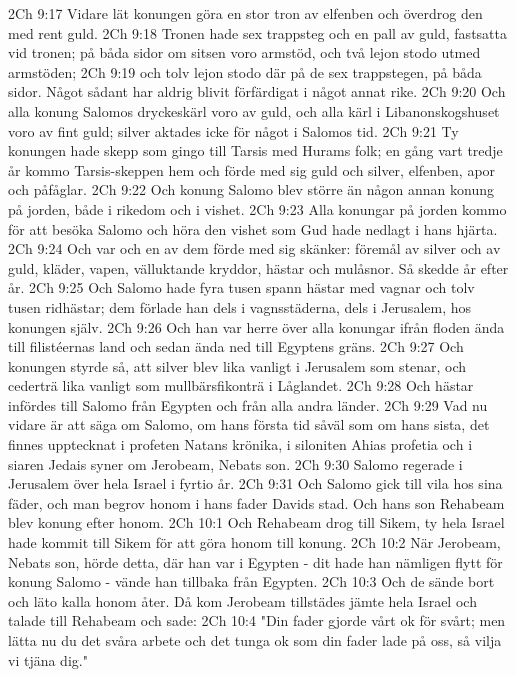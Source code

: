 2Ch 9:17  Vidare lät konungen göra en stor tron av elfenben och överdrog den med rent guld.
2Ch 9:18  Tronen hade sex trappsteg och en pall av guld, fastsatta vid tronen; på båda sidor om sitsen voro armstöd, och två lejon stodo utmed armstöden;
2Ch 9:19  och tolv lejon stodo där på de sex trappstegen, på båda sidor. Något sådant har aldrig blivit förfärdigat i något annat rike.
2Ch 9:20  Och alla konung Salomos dryckeskärl voro av guld, och alla kärl i Libanonskogshuset voro av fint guld; silver aktades icke för något i Salomos tid.
2Ch 9:21  Ty konungen hade skepp som gingo till Tarsis med Hurams folk; en gång vart tredje år kommo Tarsis-skeppen hem och förde med sig guld och silver, elfenben, apor och påfåglar.
2Ch 9:22  Och konung Salomo blev större än någon annan konung på jorden, både i rikedom och i vishet.
2Ch 9:23  Alla konungar på jorden kommo för att besöka Salomo och höra den vishet som Gud hade nedlagt i hans hjärta.
2Ch 9:24  Och var och en av dem förde med sig skänker: föremål av silver och av guld, kläder, vapen, välluktande kryddor, hästar och mulåsnor. Så skedde år efter år.
2Ch 9:25  Och Salomo hade fyra tusen spann hästar med vagnar och tolv tusen ridhästar; dem förlade han dels i vagnsstäderna, dels i Jerusalem, hos konungen själv.
2Ch 9:26  Och han var herre över alla konungar ifrån floden ända till filistéernas land och sedan ända ned till Egyptens gräns.
2Ch 9:27  Och konungen styrde så, att silver blev lika vanligt i Jerusalem som stenar, och cederträ lika vanligt som mullbärsfikonträ i Låglandet.
2Ch 9:28  Och hästar infördes till Salomo från Egypten och från alla andra länder.
2Ch 9:29  Vad nu vidare är att säga om Salomo, om hans första tid såväl som om hans sista, det finnes upptecknat i profeten Natans krönika, i siloniten Ahias profetia och i siaren Jedais syner om Jerobeam, Nebats son.
2Ch 9:30  Salomo regerade i Jerusalem över hela Israel i fyrtio år.
2Ch 9:31  Och Salomo gick till vila hos sina fäder, och man begrov honom i hans fader Davids stad. Och hans son Rehabeam blev konung efter honom.
2Ch 10:1  Och Rehabeam drog till Sikem, ty hela Israel hade kommit till Sikem för att göra honom till konung.
2Ch 10:2  När Jerobeam, Nebats son, hörde detta, där han var i Egypten - dit hade han nämligen flytt för konung Salomo - vände han tillbaka från Egypten.
2Ch 10:3  Och de sände bort och läto kalla honom åter. Då kom Jerobeam tillstädes jämte hela Israel och talade till Rehabeam och sade:
2Ch 10:4  "Din fader gjorde vårt ok för svårt; men lätta nu du det svåra arbete och det tunga ok som din fader lade på oss, så vilja vi tjäna dig."
